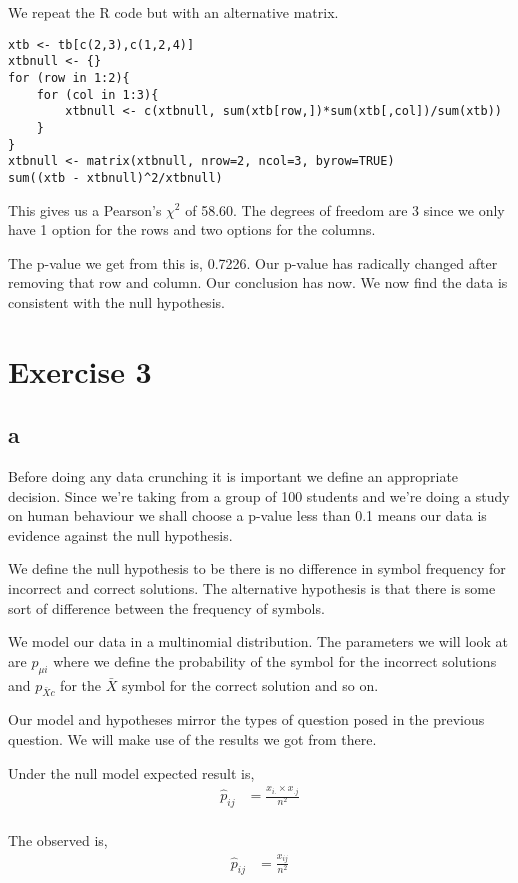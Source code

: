 \documentclass{article}
\begin{document}
We repeat the R code but with an alternative matrix.
\begin{verbatim}
xtb <- tb[c(2,3),c(1,2,4)]
xtbnull <- {}
for (row in 1:2){
    for (col in 1:3){
        xtbnull <- c(xtbnull, sum(xtb[row,])*sum(xtb[,col])/sum(xtb))
    }
}
xtbnull <- matrix(xtbnull, nrow=2, ncol=3, byrow=TRUE)
sum((xtb - xtbnull)^2/xtbnull)
\end{verbatim}

This gives us a Pearson's $\chi^2$ of 58.60. The degrees of freedom are 3
since we only have 1 option for the rows and two options for the columns.

The p-value we get from this is, 0.7226. Our p-value has radically changed after
removing that row and column. Our conclusion has now. We now find the data 
is consistent with the null hypothesis.

\section{Exercise 3}
\subsection{a}
Before doing any data crunching it is important we define an appropriate
decision. Since we're taking from a group of 100 students and we're doing a
study on human behaviour we shall choose a p-value less than 0.1 means our data
is evidence against the null hypothesis.

We define the null hypothesis to be there is no difference in symbol frequency
for incorrect and correct solutions. The alternative hypothesis is that there is
some sort of difference between the frequency of symbols.

We model our data in a multinomial distribution.
The parameters we will look at are $p_{\mu i}$ where we define the probability
of the symbol for the incorrect solutions and $p_{\bar{X} c}$ for the $\bar{X}$
symbol for the correct solution and so on.

Our model and hypotheses mirror the types of question posed in the previous
question. We will make use of the results we got from there.

Under the null model expected result is,
\begin{align*}
    \hat{p}_{ij} &= \frac{x_{i.} \times x_{.j}}{n^2} \\
\end{align*}

The observed is,
\begin{align*}
    \hat{p}_{ij} &= \frac{x_{ij}}{n^2} \\
\end{align*}
\end{document}
